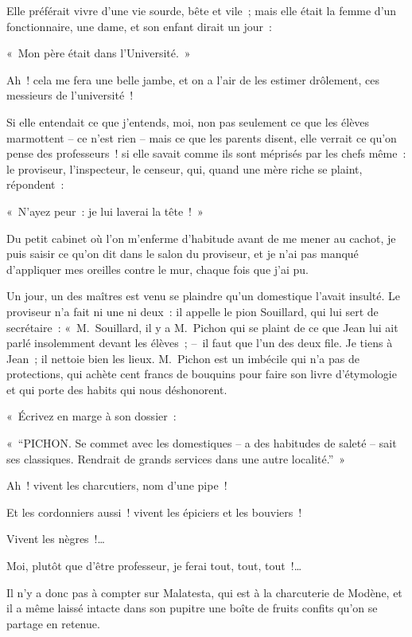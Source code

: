 \documentclass[french,twoside]{book} %
\begin{document}
Elle préférait vivre d’une vie sourde, bête et vile ; mais elle était la femme d’un fonctionnaire, une dame, et son enfant dirait un jour :\par
« Mon père était dans l’Université. »\par
Ah ! cela me fera une belle jambe, et on a l’air de les estimer drôlement, ces messieurs de l’université !\par
Si elle entendait ce que j’entends, moi, non pas seulement ce que les élèves marmottent – ce n’est rien – mais ce que les parents disent, elle verrait ce qu’on pense des professeurs ! si elle savait comme ils sont méprisés par les chefs même : le proviseur, l’inspecteur, le censeur, qui, quand une mère riche se plaint, répondent :\par
« N’ayez peur : je lui laverai la tête ! »\par
Du petit cabinet où l’on m’enferme d’habitude avant de me mener au cachot, je puis saisir ce qu’on dit dans le salon du proviseur, et je n’ai pas manqué d’appliquer mes oreilles contre le mur, chaque fois que j’ai pu.\par
Un jour, un des maîtres est venu se plaindre qu’un domestique l’avait insulté. Le proviseur n’a fait ni une ni deux : il appelle le pion Souillard, qui lui sert de secrétaire : « M. Souillard, il y a M. Pichon qui se plaint de ce que Jean lui ait parlé insolemment devant les élèves ; – il faut que l’un des deux file. Je tiens à Jean ; il nettoie bien les lieux. M. Pichon est un imbécile qui n’a pas de protections, qui achète cent francs de bouquins pour faire son livre d’étymologie et qui porte des habits qui nous déshonorent.\par
« Écrivez en marge à son dossier :\par
« “PICHON. Se commet avec les domestiques – a des habitudes de saleté – sait ses classiques. Rendrait de grands services dans une autre localité.” »\par
\bigbreak
\noindent Ah ! vivent les charcutiers, nom d’une pipe !\par
Et les cordonniers aussi ! vivent les épiciers et les bouviers !\par
Vivent les nègres !…\par
Moi, plutôt que d’être professeur, je ferai tout, tout, tout !…\par
\bigbreak
\noindent Il n’y a donc pas à compter sur Malatesta, qui est à la charcuterie de Modène, et il a même laissé intacte dans son pupitre une boîte de fruits confits qu’on se partage en retenue.\par
\end{document}
